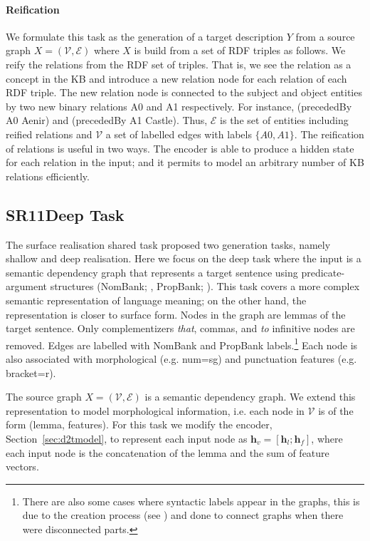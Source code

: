 \documentclass[11pt,a4paper,dvipsnames]{article}
\newcommand{\nl}[1]{\textit{{\small #1}}}
\begin{document}
\paragraph{Reification}
We formulate this task as the generation of a target description $Y$ 
from a source graph $X=(\mathcal{V}, \mathcal{E})$ where $X$ 
is build from a set of RDF triples as follows. 
We reify the relations \cite{baader2003description} from the RDF set of 
triples. That is, we see the relation as a concept in the KB and
introduce a new relation node for each relation of each RDF triple.
The new relation node is connected to the subject and object entities 
by two new binary relations A0 and A1 respectively.
For instance, ({\sffamily precededBy A0 Aenir}) and ({\sffamily precededBy A1 Castle}).
Thus, $\mathcal{E}$ is the set of entities including reified relations
and  $\mathcal{V}$ a set of labelled edges with labels $\{A0, A1\}$.
The reification of relations is useful in two ways. The encoder is able to 
produce a hidden state for each relation in the input; and it permits to model
an arbitrary number of KB relations efficiently.


\subsection{SR11Deep Task}
The surface realisation shared task \cite{belz2011first} 
proposed two generation tasks, namely shallow and deep realisation.
Here we focus on the deep task where the input is a semantic dependency graph that
represents a target sentence using predicate-argument structures
(NomBank; \cite{meyers2004nombank}, PropBank; \cite{palmer2005proposition}).
This task covers a more complex semantic representation of
language meaning; on the other hand, the representation is closer
to surface form. 
Nodes in the graph are lemmas of the target sentence. Only complementizers \nl{that}, commas, and \nl{to}
infinitive nodes are removed. Edges are labelled with NomBank
and PropBank labels.\footnote{There are also some cases where syntactic
 labels appear in the graphs, this is due to the creation process (see \cite{belz2011first})
 and done to connect graphs when there were disconnected parts.}
Each node is also associated with morphological (e.g. num=sg) and
punctuation features (e.g. bracket=r). 

The source graph $X=(\mathcal{V}, \mathcal{E})$ is a semantic 
dependency graph. We extend this representation to model morphological
information, i.e. each node in $\mathcal{V}$ is of the form
(lemma, features). For this task we modify the encoder, Section~\ref{sec:d2tmodel},
to represent each input node as $\mathbf{h}_v= [\mathbf{h}_l;\mathbf{h}_f] $,
where each input node is the concatenation of the lemma and the sum of feature
vectors.
\end{document}
